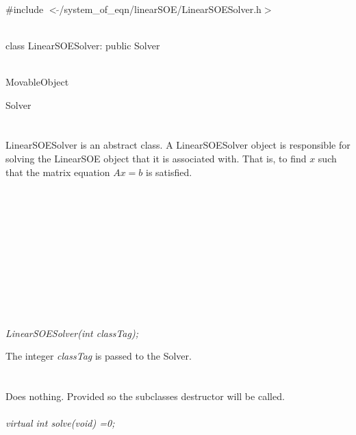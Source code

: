 
   \\
\#include $<\tilde{ }$/system\_of\_eqn/linearSOE/LinearSOESolver.h$>$  


  \\
class LinearSOESolver: public Solver  


 \\
MovableObject 

\indent\indent  Solver \\
\indent\indent{} \\

  \\
\indent LinearSOESolver is an abstract class. A LinearSOESolver object is
responsible for solving the LinearSOE object that it is associated
with. That is, to find $x$ such that the matrix equation $Ax=b$ is
satisfied. \\

  \\
\indent{} \\
\indent{}  \\ \\
\indent{} \\
\indent{}\\  \\
\indent{}  \\
\indent{} \\
\indent{} \\

  \\
{\em LinearSOESolver(int classTag);}  

The integer {\em classTag} is passed to the Solver. \\

 \\
\\ 
Does nothing. Provided so the subclasses destructor will be called. \\

  \\
{\em virtual int solve(void) =0;} 

